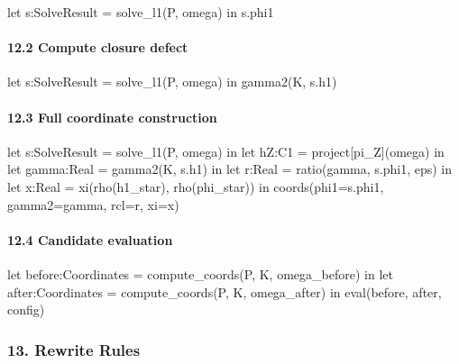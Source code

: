 \documentclass[
]{article}
\newenvironment{Shaded}{\begin{snugshade}}{\end{snugshade}}
\newcommand{\NormalTok}[1]{\textcolor[rgb]{0.12,0.11,0.11}{#1}}
\begin{document}
\begin{Shaded}
\begin{Highlighting}[]
\NormalTok{let s:SolveResult = solve\_l1(P, omega) in}
\NormalTok{s.phi1}
\end{Highlighting}
\end{Shaded}

\paragraph{12.2 Compute closure defect}\label{compute-closure-defect}

\begin{Shaded}
\begin{Highlighting}[]
\NormalTok{let s:SolveResult = solve\_l1(P, omega) in}
\NormalTok{gamma2(K, s.h1)}
\end{Highlighting}
\end{Shaded}

\paragraph{12.3 Full coordinate construction}\label{full-coordinate-construction}

\begin{Shaded}
\begin{Highlighting}[]
\NormalTok{let s:SolveResult = solve\_l1(P, omega) in}
\NormalTok{let hZ:C1 = project[pi\_Z](omega) in}
\NormalTok{let gamma:Real = gamma2(K, s.h1) in}
\NormalTok{let r:Real = ratio(gamma, s.phi1, eps) in}
\NormalTok{let x:Real = xi(rho(h1\_star), rho(phi\_star)) in}
\NormalTok{coords(phi1=s.phi1, gamma2=gamma, rcl=r, xi=x)}
\end{Highlighting}
\end{Shaded}

\paragraph{12.4 Candidate evaluation}\label{candidate-evaluation}

\begin{Shaded}
\begin{Highlighting}[]
\NormalTok{let before:Coordinates = compute\_coords(P, K, omega\_before) in}
\NormalTok{let after:Coordinates  = compute\_coords(P, K, omega\_after) in}
\NormalTok{eval(before, after, config)}
\end{Highlighting}
\end{Shaded}

\subsubsection{13. Rewrite Rules}\label{rewrite-rules-1}
\end{document}

